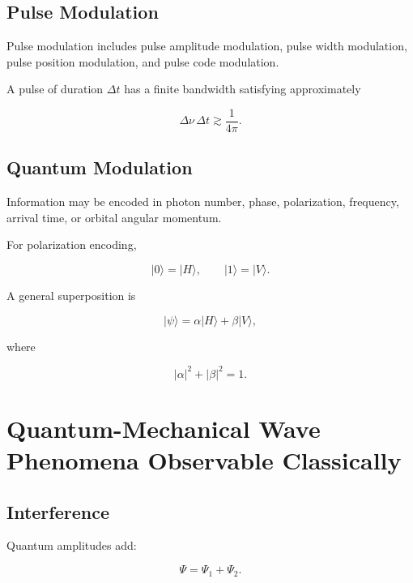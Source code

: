 \documentclass[12pt]{article}
\begin{document}
\subsection{Pulse Modulation}

Pulse modulation includes pulse amplitude modulation, pulse width modulation, pulse position modulation, and pulse code modulation.

A pulse of duration $\Delta t$ has a finite bandwidth satisfying approximately

\begin{equation}
\Delta\nu\,\Delta t\gtrsim\frac{1}{4\pi}.
\end{equation}

\subsection{Quantum Modulation}

Information may be encoded in photon number, phase, polarization, frequency, arrival time, or orbital angular momentum.

For polarization encoding,

\begin{equation}
|0\rangle=|H\rangle,
\qquad
|1\rangle=|V\rangle.
\end{equation}

A general superposition is

\begin{equation}
|\psi\rangle
=
\alpha|H\rangle+\beta|V\rangle,
\end{equation}

where

\begin{equation}
|\alpha|^2+|\beta|^2=1.
\end{equation}

\section{Quantum-Mechanical Wave Phenomena Observable Classically}

\subsection{Interference}

Quantum amplitudes add:

\begin{equation}
\Psi=\Psi_1+\Psi_2.
\end{equation}
\end{document}
